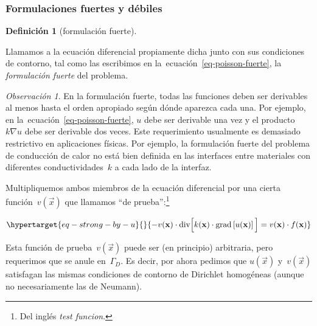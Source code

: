 \documentclass[
  12pt,
  a4paper,
  table]{scrbook}
\theoremstyle{plain}
\theoremstyle{definition}
\newtheorem{definition}{Definición}[chapter]
\theoremstyle{plain}
\theoremstyle{plain}
\theoremstyle{remark}
\newtheorem*{remark}{Observación}
\begin{document}
\hypertarget{formulaciones-fuertes-y-duxe9biles}{%
\subsubsection{Formulaciones fuertes y
débiles}\label{formulaciones-fuertes-y-duxe9biles}}

\begin{definition}[formulación
fuerte]\protect\hypertarget{def-formulacion-fuerte}{}\label{def-formulacion-fuerte}

Llamamos a la ecuación diferencial propiamente dicha junto con sus
condiciones de contorno, tal como las escribimos en
la~ecuación~\ref{eq-poisson-fuerte}, la \emph{formulación fuerte} del
problema.

\end{definition}

\begin{remark}

En la formulación fuerte, todas las funciones deben ser derivables al
menos hasta el orden apropiado según dónde aparezca cada una. Por
ejemplo, en la~ecuación~\ref{eq-poisson-fuerte}, \(u\) debe ser
derivable una vez y el producto~\(k \nabla u\) debe ser derivable dos
veces. Este requerimiento usualmente es demasiado restrictivo en
aplicaciones físicas. Por ejemplo, la formulación fuerte del problema de
conducción de calor no está bien definida en las interfaces entre
materiales con diferentes conductividades~\(k\) a cada lado de la
interfaz.

\end{remark}

Multipliquemos ambos miembros de la ecuación diferencial por una cierta
función~\(v(\vec{x})\) que llamamos ``de prueba'':\footnote{Del inglés
  \foreignlanguage{american}{\emph{test funcion}}.}

\begin{equation}\protect\hypertarget{eq-strong-by-u}{}{
 -v(\vec{x}) \cdot \text{div} \Big[ k(\vec{x}) \cdot \text{grad} \left[ u(\vec{x}) \right] \Big] =
 v(\vec{x}) \cdot f(\vec{x})
}\label{eq-strong-by-u}\end{equation}

Esta función de prueba~\(v(\vec{x})\) puede ser (en principio)
arbitraria, pero requerimos que se anule en~\(\Gamma_D\). Es decir, por
ahora pedimos que \(u(\vec{x})\) y~\(v(\vec{x})\) satisfagan las mismas
condiciones de contorno de Dirichlet homogéneas (aunque no
necesariamente las de Neumann).
\end{document}
